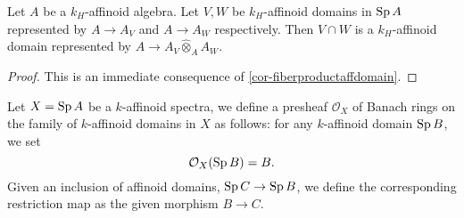 \begin{corollary}\label{cor-affdomainquotient}
    Let $A$ be a $k_H$-affinoid algebra. Let $V,W$ be $k_H$-affinoid domains in $\operatorname{Sp} A$ represented by $A\rightarrow A_V$ and $A\rightarrow A_W$ respectively. Then $V\cap W$ is a $k_H$-affinoid domain represented by $A\rightarrow A_V\hat{\otimes}_A A_W$.
\end{corollary}
\begin{proof}
    This is an immediate consequence of \cref{cor-fiberproductaffdomain}.
    \iffalse
    Observe that $A_V\hat{\otimes}_A A_W$ is $k_H$-affinoid by \cref{prop-existfiberprod}.
    We verify the universal property: let $\Sp B\rightarrow \Sp A$ be a morphism that factors through $V\cap W$, then from the universal properties of $V$ and $W$, we find morphisms $A_V\rightarrow B$ and $A_W\rightarrow B$, both being $A$-linear. So we obtain an induced morphism $A_V\hat{\otimes}_A A_W\rightarrow B$. The morphism is clearly unique.
\fi
\end{proof}

\begin{definition}\label{def-presheafOX}
   Let $X=\operatorname{Sp} A$ be a $k$-affinoid spectra, we define a presheaf $\mathcal{O}_X$ of Banach rings on the family of $k$-affinoid domains in $X$ as follows: for any $k$-affinoid domain $\operatorname{Sp} B$, we set
   \[
        \mathcal{O}_X(\operatorname{Sp} B)=B.
   \]
   Given an inclusion of affinoid domains, $\operatorname{Sp} C\rightarrow \operatorname{Sp} B$, we define the corresponding restriction map as the given morphism $B\rightarrow C$.
\end{definition}

